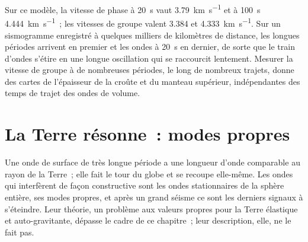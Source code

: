 Sur ce modèle, la vitesse de phase à \qty{20}{s} vaut \qty{3.79}{km.s^{-1}} et à
\qty{100}{s} \qty{4.444}{km.s^{-1}}~; les vitesses de groupe valent 3.384 et
\qty{4.333}{km.s^{-1}}. Sur un sismogramme enregistré à quelques milliers de kilomètres
de distance, les longues périodes arrivent en premier et les ondes à \qty{20}{s} en dernier, de sorte que le
train d'ondes s'étire en une longue oscillation qui se raccourcit lentement. Mesurer
la vitesse de groupe à de nombreuses périodes, le long de nombreux trajets, donne des cartes
de l'épaisseur de la croûte et du manteau supérieur, indépendantes des temps
de trajet des ondes de volume.

\section{La Terre résonne~: modes propres}

Une onde de surface de très longue période a une longueur d'onde comparable
au rayon de la Terre~; elle fait le tour du globe et se recoupe elle-même. Les ondes qui
interfèrent de façon constructive sont les ondes stationnaires de la sphère entière, ses modes
propres, et après un grand séisme ce sont les derniers signaux à s'éteindre.
Leur théorie, un problème aux valeurs propres pour la Terre élastique et auto-gravitante,
dépasse le cadre de ce chapitre~; leur description, elle, ne le fait pas.

